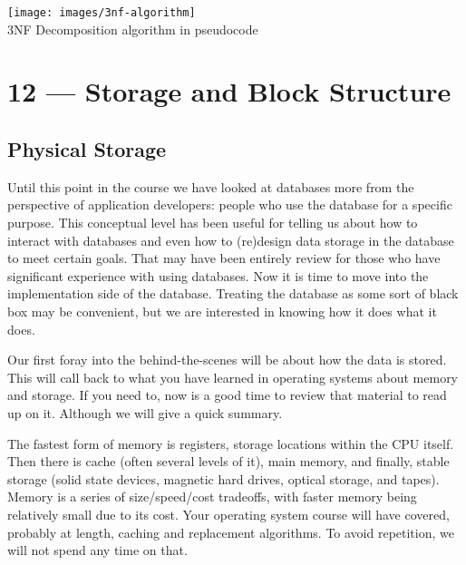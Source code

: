 \documentclass[a4paper]{report}
\begin{document}
\begin{center}
\texttt{[image: images/3nf-algorithm]}\\
3NF Decomposition algorithm in pseudocode~\cite{dsc}
\end{center}









\chapter*{12 --- Storage and Block Structure}


\section*{Physical Storage}

Until this point in the course we have looked at databases more from the perspective of application developers: people who use the database for a specific purpose. This conceptual level has been useful for telling us about how to interact with databases and even how to (re)design data storage in the database to meet certain goals. That may have been entirely review for those who have significant experience with using databases. Now it is time to move into the implementation side of the database. Treating the database as some sort of black box may be convenient, but we are interested in knowing how it does what it does. 

Our first foray into the behind-the-scenes will be about how the data is stored. This will call back to what you have learned in operating systems about memory and storage. If you need to, now is a good time to review that material to read up on it. Although we will give a quick summary. 

The fastest form of memory is registers, storage locations within the CPU itself. Then there is cache (often several levels of it), main memory, and finally, stable storage (solid state devices, magnetic hard drives, optical storage, and tapes). Memory is a series of size/speed/cost tradeoffs, with faster memory being relatively small due to its cost. Your operating system course will have covered, probably at length, caching and replacement algorithms. To avoid repetition, we will not spend any time on that.
\end{document}
